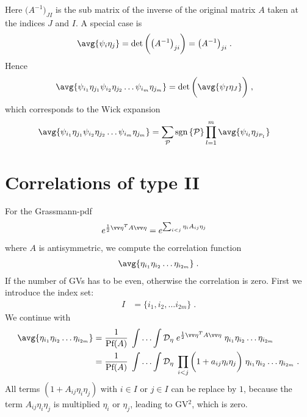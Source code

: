 Here $\big(A^{-1}\big)_{JI}$ is the sub matrix of the inverse of the original matrix $A$ taken at the indices $J$ and $I$.
%
A special case is
 \begin{align*}
\avg{\psi_{i}\eta_{j}}
&=\det\bigg( \big(A^{-1}\big)_{ji}\bigg)= \big(A^{-1}\big)_{ji}\;.
\end{align*}
%
Hence
%
\begin{align*}
\avg{\psi_{i_{1}}\eta_{j_{1}}\psi_{i_{2}}\eta_{j_{2}}\ldots \psi_{i_{m}}\eta_{j_{m}}}
&=\det\bigg(\avg{\psi_{I}\eta_{J}}\bigg)\;,
\end{align*}
%
which corresponds to the Wick expansion
%
\begin{align*}
\avg{\psi_{i_{1}}\eta_{j_{1}}\psi_{i_{2}}\eta_{j_{2}}\ldots \psi_{i_{m}}\eta_{j_{m}}}&=
\sum_{\cP } \sign{\cP } \prod_{l=1}^{m} \avg{\psi_{i_{l}} \eta_{j_{\cP _{l}}} }
\end{align*}
%




\section{Correlations of type II}




For the Grassmann-pdf
%
\begin{align*}
e^{\frac{1}{2}\vv \eta^{T} A \vv \eta} &=e^{\sum_{i<j} \eta_{i} A_{ij}\eta_{j}}
\end{align*}
%
where $A$ is antisymmetric, we compute the correlation function
%
\begin{align*}
\avg{\eta_{i_{1}}\eta_{i_{2}}\ldots \eta_{i_{2 m}}}\;.
\end{align*}
%
If the number of GVs has to be even, otherwise the correlation is zero.
%
First we  introduce the index set: 
%
\begin{align*}
I &=\{i_{1},i_{2},\ldots i_{2m}\}\;.
\end{align*}
%
We continue with 
%
\begin{align*}
\avg{\eta_{i_{1}}\eta_{i_{2}}\ldots \eta_{i_{2 m}}} 
&=\frac{1}{\text{Pf}(A)}\;\Int \Deta  \; e^{\frac{1}{2}\vv \eta^{T} A \vv \eta}\;
\eta_{i_{1}}\eta_{i_{2}}\ldots \eta_{i_{2 m}}\\
&=\frac{1}{\text{Pf}(A)}\;\Int \Deta  \; \prod_{i<j}
\bigg( 1 + a_{ij}\eta_{i}\eta_{j} \bigg)\;
\eta_{i_{1}}\eta_{i_{2}}\ldots \eta_{i_{2 m}}\;.
\end{align*}
%
All terms $(1+A_{ij}\eta_{i}\eta_{j})$ with $i\in I$ or $j\in I$ can be replace by $1$, because
the  term $A_{ij} \eta_{i}\eta_{j}$ is multiplied $\eta_{i}$  or $\eta_{j}$, leading to GV$^{2}$, which is zero. 


